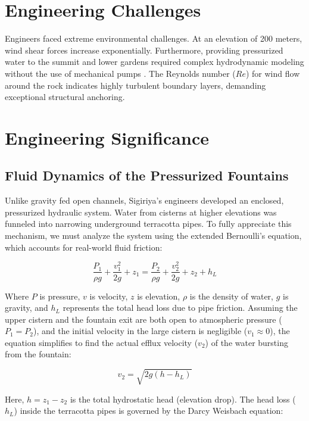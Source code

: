 \documentclass[12pt,a4paper]{report}
\begin{document}
	\section{Engineering Challenges}
	Engineers faced extreme environmental challenges. At an elevation of 200 meters, wind shear forces increase exponentially. Furthermore, providing pressurized water to the summit and lower gardens required complex hydrodynamic modeling without the use of mechanical pumps \cite{jayawardena2017}. The Reynolds number ($Re$) for wind flow around the rock indicates highly turbulent boundary layers, demanding exceptional structural anchoring.
	
	\section{Engineering Significance}
	
	\subsection{Fluid Dynamics of the Pressurized Fountains}
	Unlike gravity fed open channels, Sigiriya's engineers developed an enclosed, pressurized hydraulic system. Water from cisterns at higher elevations was funneled into narrowing underground terracotta pipes. To fully appreciate this mechanism, we must analyze the system using the extended Bernoulli’s equation, which accounts for real-world fluid friction:
	
	\begin{equation}
		\frac{P_1}{\rho g} + \frac{v_1^2}{2g} + z_1 = \frac{P_2}{\rho g} + \frac{v_2^2}{2g} + z_2 + h_L
	\end{equation}
	
	Where $P$ is pressure, $v$ is velocity, $z$ is elevation, $\rho$ is the density of water, $g$ is gravity, and $h_L$ represents the total head loss due to pipe friction. Assuming the upper cistern and the fountain exit are both open to atmospheric pressure ($P_1 = P_2$), and the initial velocity in the large cistern is negligible ($v_1 \approx 0$), the equation simplifies to find the actual efflux velocity ($v_2$) of the water bursting from the fountain:
	
	\begin{equation}
		v_2 = \sqrt{2g(h - h_L)}
	\end{equation}
	
	Here, $h = z_1 - z_2$ is the total hydrostatic head (elevation drop). The head loss ($h_L$) inside the terracotta pipes is governed by the Darcy Weisbach equation:
	
\end{document}
